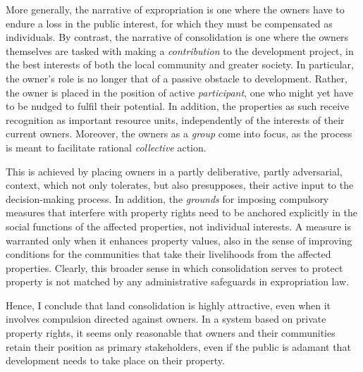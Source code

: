 More generally, the narrative of expropriation is one where the owners have to endure a loss in the public interest, for which they must be compensated as individuals. By contrast, the narrative of consolidation is one where the owners themselves are tasked with making a {\it contribution} to the development project, in the best interests of both the local community and greater society. In particular, the owner's role is no longer that of a passive obstacle to development. Rather, the owner is placed in the position of active {\it participant}, one who might yet have to be nudged to fulfil their potential. In addition, the properties as such receive recognition as important resource units, independently of the interests of their current owners. Moreover, the owners as a {\it group} come into focus, as the process is meant to facilitate rational {\it collective} action.

This is achieved by placing owners in a partly deliberative, partly adversarial, context, which not only tolerates, but also presupposes, their active input to the decision-making process. In addition, the {\it grounds} for imposing compulsory measures that interfere with property rights need to be anchored explicitly in the social functions of the affected properties, not individual interests. A measure is warranted only when it enhances property values, also in the sense of improving conditions for the communities that take their livelihoods from the affected properties. Clearly, this broader sense in which consolidation serves to protect property is not matched by any administrative safeguards in expropriation law.

Hence, I conclude that land consolidation is highly attractive, even when it involves compulsion directed against owners. In a system based on private property rights, it seems only reasonable that owners and their communities retain their position as primary stakeholders, even if the public is adamant that development needs to take place on their property.

 
